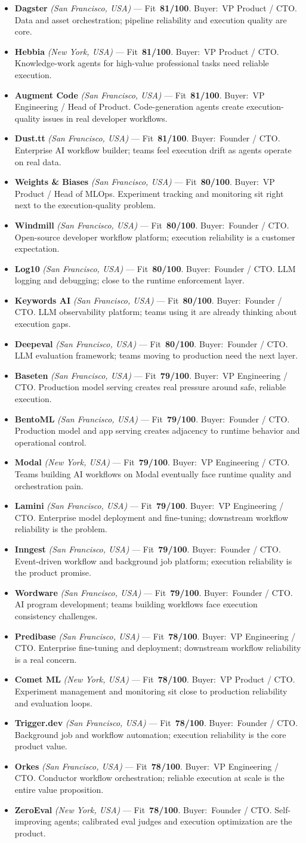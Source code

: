 \documentclass[10pt]{article}
\newcommand{\cand}[5]{\item \textbf{#1} \textit{(#2)} --- Fit~\textbf{#3/100}. Buyer:~#4. #5}
\begin{document}
\begin{itemize}
\cand{Dagster}{San Francisco, USA}{81}{VP Product / CTO}{Data and asset orchestration; pipeline reliability and execution quality are core.}
\cand{Hebbia}{New York, USA}{81}{VP Product / CTO}{Knowledge-work agents for high-value professional tasks need reliable execution.}
\cand{Augment Code}{San Francisco, USA}{81}{VP Engineering / Head of Product}{Code-generation agents create execution-quality issues in real developer workflows.}
\cand{Dust.tt}{San Francisco, USA}{81}{Founder / CTO}{Enterprise AI workflow builder; teams feel execution drift as agents operate on real data.}
\cand{Weights & Biases}{San Francisco, USA}{80}{VP Product / Head of MLOps}{Experiment tracking and monitoring sit right next to the execution-quality problem.}
\cand{Windmill}{San Francisco, USA}{80}{Founder / CTO}{Open-source developer workflow platform; execution reliability is a customer expectation.}
\cand{Log10}{San Francisco, USA}{80}{Founder / CTO}{LLM logging and debugging; close to the runtime enforcement layer.}
\cand{Keywords AI}{San Francisco, USA}{80}{Founder / CTO}{LLM observability platform; teams using it are already thinking about execution gaps.}
\cand{Deepeval}{San Francisco, USA}{80}{Founder / CTO}{LLM evaluation framework; teams moving to production need the next layer.}
\cand{Baseten}{San Francisco, USA}{79}{VP Engineering / CTO}{Production model serving creates real pressure around safe, reliable execution.}
\cand{BentoML}{San Francisco, USA}{79}{Founder / CTO}{Production model and app serving creates adjacency to runtime behavior and operational control.}
\cand{Modal}{New York, USA}{79}{VP Engineering / CTO}{Teams building AI workflows on Modal eventually face runtime quality and orchestration pain.}
\cand{Lamini}{San Francisco, USA}{79}{VP Engineering / CTO}{Enterprise model deployment and fine-tuning; downstream workflow reliability is the problem.}
\cand{Inngest}{San Francisco, USA}{79}{Founder / CTO}{Event-driven workflow and background job platform; execution reliability is the product promise.}
\cand{Wordware}{San Francisco, USA}{79}{Founder / CTO}{AI program development; teams building workflows face execution consistency challenges.}
\cand{Predibase}{San Francisco, USA}{78}{VP Engineering / CTO}{Enterprise fine-tuning and deployment; downstream workflow reliability is a real concern.}
\cand{Comet ML}{New York, USA}{78}{VP Product / CTO}{Experiment management and monitoring sit close to production reliability and evaluation loops.}
\cand{Trigger.dev}{San Francisco, USA}{78}{Founder / CTO}{Background job and workflow automation; execution reliability is the core product value.}
\cand{Orkes}{San Francisco, USA}{78}{VP Engineering / CTO}{Conductor workflow orchestration; reliable execution at scale is the entire value proposition.}
\cand{ZeroEval}{New York, USA}{78}{Founder / CTO}{Self-improving agents; calibrated eval judges and execution optimization are the product.}
\end{itemize}
\end{document}
